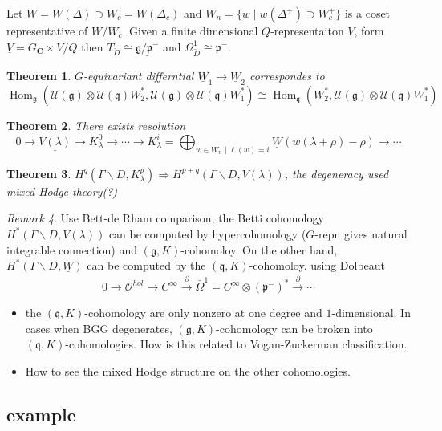 \documentclass[leqno]{amsart}
\newcommand{\C}{\mathbf C}
\newcommand{\oo}{\mathcal O}
\newcommand{\1}{\mathbf{1}}
\newcommand{\cfg}{\mathfrak{g}}
\newcommand{\cfp}{\mathfrak{p}}
\newcommand{\cfq}{\mathfrak{q}}
\DeclareMathOperator{\Hom}{Hom}
\newtheorem{thm}{Theorem}[section]
\theoremstyle{definition}
\theoremstyle{remark}
\newtheorem{rem}[thm]{Remark}
\begin{document}
Let $W=W(\Delta)\supset W_c=W(\Delta_c)$
and  $W_n=\{w\mid w(\Delta^+)\supset W^+_c\}$ 
is a coset representative of $W/W_c$.
Given a finite dimensional
$Q$-representaiton  $V$,
form  $\underline{V}=G_\C\times V/Q$
then
$T_{\check{D}}\cong \underline{\cfg/\cfp^-}$
and $\Omega^1_{\check{D}}\cong \underline{\cfp^-}$.
\begin{thm}
	$G$-equivariant differntial
	$\underline{W}_1\to
	\underline{W}_2$ 
	correspondes
	to 
	\[
		\Hom_\cfg(
		\mathcal{U}(\cfg)\otimes
		\mathcal{U}(\cfq)W_2^*,
		\mathcal{U}(\cfg)\otimes
		\mathcal{U}(\cfq)W_1^*)
		\cong 
		\Hom_\cfq( W_2^*,
		\mathcal{U}(\cfg)\otimes
		\mathcal{U}(\cfq)W_1^*)
	\]
\end{thm}
\begin{thm}
	There exists resolution
	\[
		0\to
		\underline{V(\lambda)}\to
		K^0_\lambda\to\cdots\to
		K^i_\lambda=\bigoplus_{
		w\in W_n\mid \ell(w)=i}
		\underline{W}(w(\lambda+\rho)-\rho)\to \cdots
	\]
\end{thm}

\begin{thm}
	$H^q(\Gamma\backslash D,K^p_\lambda)
	\Longrightarrow H^{p+q}
	(\Gamma\backslash D, V(\lambda))$,
	the degeneracy used mixed Hodge 
	theory(?)
\end{thm}
\begin{rem}
	Use Bett-de Rham comparison,
	the Betti cohomology
	$H^*(\Gamma\backslash D, V(\lambda))$
	can be computed by 
	hypercohomology
	($G$-repn gives natural 
	integrable connection)
	and
	$(\cfg,K)$-cohomoloy.
	On the other hand,
	$H^*(\Gamma\backslash D, \underline{W})$
	can be computed by the
	$(\cfq,K)$-cohomoloy.
	using Dolbeaut
	\[
		0\to \oo^{hol}\to C^\infty
		\xrightarrow{\bar{\partial}}
		\bar{\Omega}^1=
		C^\infty\otimes(\cfp^-)^*
		\xrightarrow{\bar{\partial}}\cdots
	\]
	\begin{itemize}
		\item the $(\cfq,K)$-cohomology
			are only nonzero at
			one degree and 
			 $1$-dimensional.
		In cases when BGG degenerates,
		$(\cfg,K)$-cohomology 
		can be broken into
		$(\cfq,K)$-cohomologies.
		How is this related to 
		Vogan-Zuckerman 
		classification.
	\item How to see the mixed Hodge structure
		on the other cohomologies.
	\end{itemize}
\end{rem}

\subsection{example}
\end{document}
